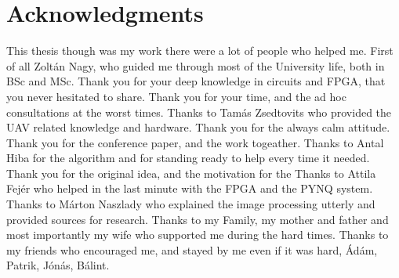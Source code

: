 \chapter*{Acknowledgments}

This thesis though was my work there were a lot of people who helped me.
First of all Zoltán Nagy, who guided me through most of the University life, both in BSc and MSc.
Thank you for your deep knowledge in circuits and FPGA, that you never hesitated to share.
Thank you for your time, and the ad hoc consultations at the worst times.
Thanks to Tamás Zsedtovits who provided the UAV related knowledge and hardware.
Thank you for the always calm attitude.
Thank you for the conference paper, and the work togeather.
Thanks to Antal Hiba for the algorithm and for standing ready to help every time it needed.
Thank you for the original idea, and the motivation for the 
Thanks to Attila Fejér who helped in the last minute with the FPGA and the PYNQ system.
Thanks to Márton Naszlady who explained the image processing utterly and provided sources for research.
Thanks to my Family, my mother and father and most importantly my wife who supported me during the hard times.
Thanks to my friends who encouraged me, and stayed by me even if it was hard, Ádám, Patrik, Jónás, Bálint.


\clearpage